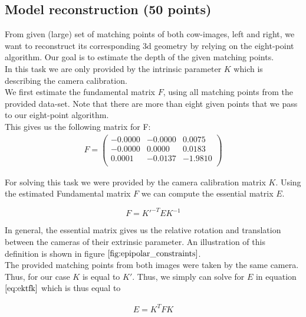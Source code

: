 \documentclass{paper}
\begin{document}
\subsection{Model reconstruction (50 points)}

From given (large) set of matching points of both cow-images, left and right, we want to reconstruct its corresponding 3d geometry by relying on the eight-point algorithm. Our goal is to estimate the depth of the given matching points. \\

In this task we are only provided by the intrinsic parameter $K$ which is describing the camera calibration. \\

We first estimate the fundamental matrix $F$, using all matching points from the provided data-set. Note that there are more than eight given points that we pass to our eight-point algorithm. \\

This gives us the following matrix for F:
\begin{align}
F = 
\left(\begin{array}{rrr}
   -0.0000  & -0.0000 &   0.0075 \\
   -0.0000  &  0.0000 &   0.0183 \\
    0.0001  & -0.0137 &  -1.9810 \\
\end{array} \right)
\end{align}

For solving this task we were provided by the camera calibration matrix $K$.  
Using the estimated Fundamental matrix $F$ we can compute the essential matrix $E$.

\begin{equation}
    F = K'^{-T} E K^{-1}
\label{eq:ektfk}
\end{equation}

In general, the essential matrix gives us the relative rotation and translation between the cameras of their extrinsic parameter. An illustration of this definition is shown in figure $\ref{fig:epipolar_constraints}$. \\

The provided matching points from both images were taken by the same camera. Thus, for our case $K$ is equal to $K'$. Thus, we simply can solve for $E$ in equation $\ref{eq:ektfk}$ which is thus equal to

\begin{align}
    E = K^{T} F K
\end{align}
\end{document}

